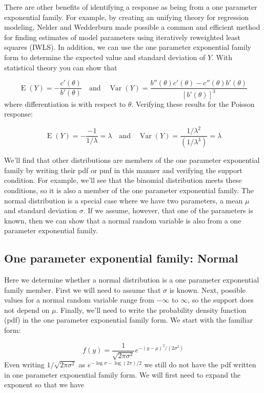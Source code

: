 \documentclass[
]{krantz}
\newcommand{\E}{\operatorname{E}}
\newcommand{\var}{\operatorname{Var}}
\begin{document}
There are other benefits of identifying a response as being from a one parameter exponential family. For example, by creating an unifying theory for regression modeling, Nelder and Wedderburn made possible a common and efficient method for finding estimates of model parameters using iteratively reweighted least squares (IWLS). In addition, we can use the one parameter exponential family form to determine the expected value and standard deviation of \(Y\). With statistical theory you can show that

\[\E(Y) =-\frac{c'(\theta)}{b'(\theta)} \quad \textrm{and} \quad \var(Y) =\frac{b''(\theta)c'(\theta)-c''(\theta)b'(\theta)}{[b'(\theta)]^3}
\]
where differentiation is with respect to \(\theta\). Verifying these results for the Poisson response:

\[\E(Y)=-\frac{-1}{1/\lambda}=\lambda \quad \textrm{and} \quad  \var(Y)=\frac{1/{{\lambda}^2}}
{(1/{\lambda}^3)}=\lambda
\]

We'll find that other distributions are members of the one parameter exponential family by writing their pdf or pmf in this manner and verifying the support condition. For example, we'll see that the binomial distribution meets these conditions, so it is also a member of the one parameter exponential family. The normal distribution is a special case where we have two parameters, a mean \(\mu\) and standard deviation \(\sigma\). If we assume, however, that one of the parameters is known, then we can show that a normal random variable is also from a one parameter exponential family.

\hypertarget{one-parameter-exponential-family-normal}{%
\subsection{One parameter exponential family: Normal}\label{one-parameter-exponential-family-normal}}

Here we determine whether a normal distribution is a one parameter exponential family member. First we will need to assume that \(\sigma\) is known. Next, possible values for a normal random variable range from \(-\infty\) to \(\infty\), so the support does not depend on \(\mu\). Finally, we'll need to write the probability density function (pdf) in the one parameter exponential family form. We start with the familiar form:

\[
f(y)=\frac{1}{{\sqrt{2\pi\sigma^2}}}{e^{-{(y-\mu)^2}/{(2\sigma^2)}}}
\]
Even writing \({1/{\sqrt{2\pi\sigma^2}}}\) as \(e^{-\log{\sigma}-\log(2\pi)/2}\) we still do not have the pdf written in one parameter exponential family form. We will first need to expand the exponent so that we have
\end{document}
